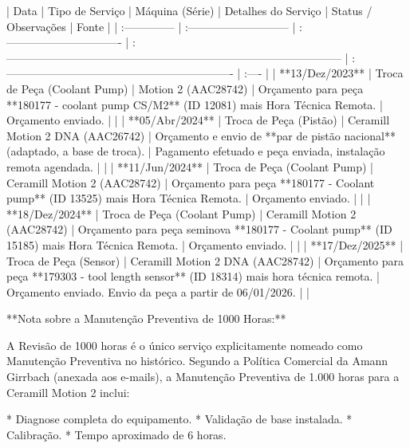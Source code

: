 | Data            | Tipo de Serviço              | Máquina (Série)                  | Detalhes do Serviço                                                                         | Status / Observações                                           | Fonte |
| :-------------- | :--------------------------- | :------------------------------- | :------------------------------------------------------------------------------------------ | :------------------------------------------------------------- | :---- |
| **13/Dez/2023** | Troca de Peça (Coolant Pump) | Motion 2 (AAC28742)              | Orçamento para peça **180177 - coolant pump CS/M2** (ID 12081) mais Hora Técnica Remota.    | Orçamento enviado.                                             |       |
| **05/Abr/2024** | Troca de Peça (Pistão)       | Ceramill Motion 2 DNA (AAC26742) | Orçamento e envio de **par de pistão nacional** (adaptado, a base de troca).                | Pagamento efetuado e peça enviada, instalação remota agendada. |       |
| **11/Jun/2024** | Troca de Peça (Coolant Pump) | Ceramill Motion 2 (AAC28742)     | Orçamento para peça **180177 - Coolant pump** (ID 13525) mais Hora Técnica Remota.          | Orçamento enviado.                                             |       |
| **18/Dez/2024** | Troca de Peça (Coolant Pump) | Ceramill Motion 2 (AAC28742)     | Orçamento para peça seminova **180177 - Coolant pump** (ID 15185) mais Hora Técnica Remota. | Orçamento enviado.                                             |       |
| **17/Dez/2025** | Troca de Peça (Sensor)       | Ceramill Motion 2 DNA (AAC28742) | Orçamento para peça **179303 - tool length sensor** (ID 18314) mais hora técnica remota.    | Orçamento enviado. Envio da peça a partir de 06/01/2026.       |       |

**Nota sobre a Manutenção Preventiva de 1000 Horas:**

A Revisão de 1000 horas é o único serviço explicitamente nomeado como Manutenção Preventiva no histórico. Segundo a Política Comercial da Amann Girrbach (anexada aos e-mails), a Manutenção Preventiva de 1.000 horas para a Ceramill Motion 2 inclui:

  * Diagnose completa do equipamento.
  * Validação de base instalada.
  * Calibração.
  * Tempo aproximado de 6 horas.


